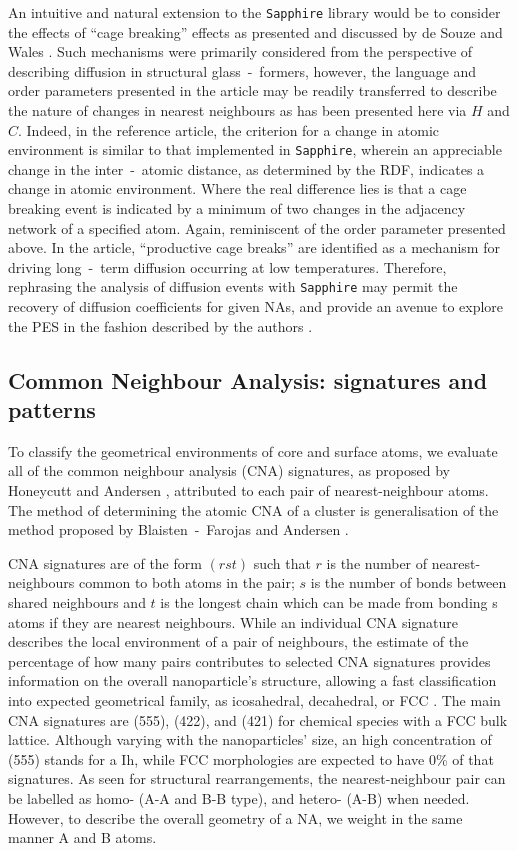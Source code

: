 An intuitive and natural extension to the \texttt{Sapphire} library would be to consider the effects of ``cage breaking'' effects as presented and discussed by de Souze and Wales \cite{10.1063/1.2992128}. Such mechanisms were primarily considered from the perspective of describing diffusion in structural glass~-~formers, however, the language and order parameters presented in the article may be readily transferred to describe the nature of changes in nearest neighbours as has been presented here via $H$ and $C$. Indeed, in the reference article, the criterion for a change in atomic environment is similar to that implemented in \texttt{Sapphire}, wherein an appreciable change in the inter~-~atomic distance, as determined by the RDF, indicates a change in atomic environment. Where the real difference lies is that a cage breaking event is indicated by a minimum of two changes in the adjacency network of a specified atom. Again, reminiscent of the order parameter presented above. In the article, ``productive cage breaks'' are identified as a mechanism for driving long~-~term diffusion occurring at low temperatures. Therefore, rephrasing the analysis of diffusion events with \texttt{Sapphire} may permit the recovery of diffusion coefficients for given NAs, and provide an avenue to explore the PES in the fashion described by the authors \cite{10.1063/1.2992128}.

\subsection{Common Neighbour Analysis: signatures and patterns}
\label{sec:CNA}
%
To classify the geometrical environments of core and surface atoms, we evaluate all of the common neighbour analysis (CNA) signatures, as proposed by Honeycutt and Andersen \cite{doi:10.1021/j100303a014}, attributed to each pair of nearest-neighbour atoms. The method of determining the atomic CNA of a cluster is generalisation of the method proposed by Blaisten~-~Farojas and Andersen \cite{BLAISTENBAROJAS1985548}.

CNA signatures are of the form $(rst)$ such that $r$ is the number of nearest-neighbours common to both atoms in the pair; $s$ is the number of bonds between shared neighbours and $t$ is the longest chain which can be made from bonding s atoms if they are nearest neighbours. 
While an individual CNA signature describes the local environment of a pair of neighbours, the estimate of the percentage of how many pairs contributes to selected CNA signatures provides information on the overall nanoparticle's structure, allowing a fast classification into expected geometrical family, as icosahedral, decahedral, or FCC \cite{Baletto_2019}.
%
The main CNA signatures are (555), (422), and (421) for chemical species with a FCC bulk lattice. Although varying with the nanoparticles' size, an high concentration of (555) stands for a Ih, while FCC morphologies are expected to have 0\% of that signatures.
%
As seen for structural rearrangements, the nearest-neighbour pair can be labelled as homo- (A-A and B-B type), and hetero- (A-B) when needed. However, to describe the overall geometry of a NA, we weight in the same manner A and B atoms.
%

